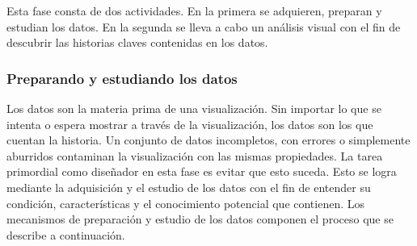 Esta fase consta de dos actividades. En la primera se adquieren, preparan y estudian los datos. En la segunda se lleva a cabo un análisis visual con el fin de descubrir las historias claves contenidas en los datos.

\subsubsection{Preparando y estudiando los datos}

Los datos son la materia prima de una visualización. Sin importar lo que se intenta o espera mostrar a través de la visualización, los datos son los que cuentan la historia. Un conjunto de datos incompletos, con errores o simplemente aburridos contaminan la visualización con las mismas propiedades. La tarea primordial como diseñador en esta fase es evitar que esto suceda. Esto se logra mediante la adquisición y el estudio de los datos con el fin de entender su condición, características y el conocimiento potencial que contienen. Los mecanismos de preparación y estudio de los datos componen el proceso que se describe a continuación.

